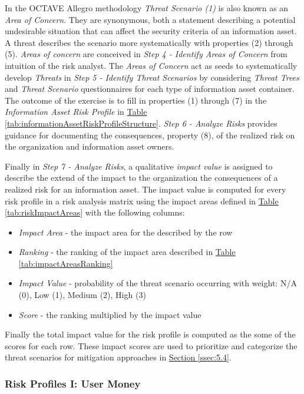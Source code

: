 \documentclass[12pt]{article} %
\newcommand{\hypertableref}[1]{\hyperref[#1]{Table \ref{#1}}}
\newcommand{\hypersectionref}[1]{\hyperref[#1]{Section \ref{#1}}}
\begin{document}
{In the OCTAVE Allegro methodology \textit{Threat Scenario (1)} is also known as an \textit{Area of Concern}. They are synonymous, both a statement describing a potential undesirable situation that can affect the security criteria of an information asset. A threat describes the scenario more systematically with properties (2) through (5). \textit{Areas of concern} are conceived in \textit{Step 4 - Identify Areas of Concern} from intuition of the risk analyst. The \textit{Areas of Concern} act as seeds to systematically develop \textit{Threats} in \textit{Step 5 - Identify Threat Scenarios} by considering \textit{Threat Trees} and \textit{Threat Scenario} questionnaires for each type of information asset container. The outcome of the exercise is to fill in properties (1) through (7) in the \textit{Information Asset Risk Profile} in \hypertableref{tab:informationAssetRiskProfileStructure}. \textit{Step 6 - Analyze Risks} provides guidance for documenting the consequences, property (8), of the realized risk on the organization and information asset owners.

Finally in \textit{Step 7 - Analyze Risks}, a qualitative \textit{impact value} is assigned to describe the extend of the impact to the organization the consequences of a realized risk for an information asset. The impact value is computed for every risk profile in a risk analysis matrix using the impact areas defined in \hypertableref{tab:riskImpactAreas} with the following columns:

\begin{itemize}
	\item \textit{Impact Area} - the impact area for the described by the row
	\item \textit{Ranking} - the ranking of the impact area described in \hypertableref{tab:impactAreasRanking}
	\item \textit{Impact Value} - probability of the threat scenario occurring with weight: N/A (0), Low (1), Medium (2), High (3)
	\item \textit{Score} - the ranking multiplied by the impact value
\end{itemize}

Finally the total impact value for the risk profile is computed as the some of the scores for each row. These impact scores are used to prioritize and categorize the threat scenarios for mitigation approaches in \hypersectionref{ssec:5.4}.

\subsubsection{Risk Profiles I: User Money} \label{sssec:5.3:userMoneyRiskProfiles}

}
\end{document}
